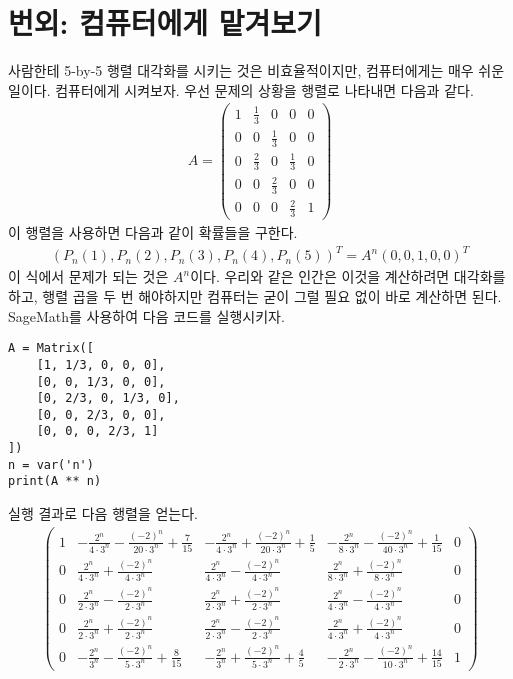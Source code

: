 \documentclass{scrartcl}
\begin{document}
\section{번외: 컴퓨터에게 맡겨보기}
사람한테 5-by-5 행렬 대각화를 시키는 것은 비효율적이지만, 컴퓨터에게는 매우 쉬운 일이다. 컴퓨터에게 시켜보자. 우선 문제의 상황을 행렬로 나타내면 다음과 같다.
\begin{align*}
  A=\begin{pmatrix}
  1 & \frac{1}{3} & 0 & 0 & 0 \\
  0 & 0 & \frac{1}{3} & 0 & 0 \\
  0 & \frac{2}{3} & 0 & \frac{1}{3} & 0 \\
  0 & 0 & \frac{2}{3} & 0 & 0 \\
  0 & 0 & 0 & \frac{2}{3} & 1
  \end{pmatrix}
\end{align*}
이 행렬을 사용하면 다음과 같이 확률들을 구한다.
\begin{align*}
  (P_n(1), P_n(2), P_n(3), P_n(4), P_n(5))^T=A^n(0, 0, 1, 0, 0)^T
\end{align*}
이 식에서 문제가 되는 것은 \(A^n\)이다. 우리와 같은 인간은 이것을 계산하려면 대각화를 하고, 행렬 곱을 두 번 해야하지만 컴퓨터는 굳이 그럴 필요 없이 바로 계산하면 된다. SageMath를 사용하여 다음 코드를 실행시키자.
\begin{lstlisting}
A = Matrix([
    [1, 1/3, 0, 0, 0],
    [0, 0, 1/3, 0, 0],
    [0, 2/3, 0, 1/3, 0],
    [0, 0, 2/3, 0, 0],
    [0, 0, 0, 2/3, 1]
])
n = var('n')
print(A ** n)
\end{lstlisting}
실행 결과로 다음 행렬을 얻는다.
\begin{align*}
  \left(\begin{array}{rrrrr}
1 & -\frac{2^{n}}{4 \cdot 3^{n}} - \frac{\left(-2\right)^{n}}{20 \cdot 3^{n}} + \frac{7}{15} & -\frac{2^{n}}{4 \cdot 3^{n}} + \frac{\left(-2\right)^{n}}{20 \cdot 3^{n}} + \frac{1}{5} & -\frac{2^{n}}{8 \cdot 3^{n}} - \frac{\left(-2\right)^{n}}{40 \cdot 3^{n}} + \frac{1}{15} & 0 \\
0 & \frac{2^{n}}{4 \cdot 3^{n}} + \frac{\left(-2\right)^{n}}{4 \cdot 3^{n}} & \frac{2^{n}}{4 \cdot 3^{n}} - \frac{\left(-2\right)^{n}}{4 \cdot 3^{n}} & \frac{2^{n}}{8 \cdot 3^{n}} + \frac{\left(-2\right)^{n}}{8 \cdot 3^{n}} & 0 \\
0 & \frac{2^{n}}{2 \cdot 3^{n}} - \frac{\left(-2\right)^{n}}{2 \cdot 3^{n}} & \frac{2^{n}}{2 \cdot 3^{n}} + \frac{\left(-2\right)^{n}}{2 \cdot 3^{n}} & \frac{2^{n}}{4 \cdot 3^{n}} - \frac{\left(-2\right)^{n}}{4 \cdot 3^{n}} & 0 \\
0 & \frac{2^{n}}{2 \cdot 3^{n}} + \frac{\left(-2\right)^{n}}{2 \cdot 3^{n}} & \frac{2^{n}}{2 \cdot 3^{n}} - \frac{\left(-2\right)^{n}}{2 \cdot 3^{n}} & \frac{2^{n}}{4 \cdot 3^{n}} + \frac{\left(-2\right)^{n}}{4 \cdot 3^{n}} & 0 \\
0 & -\frac{2^{n}}{3^{n}} - \frac{\left(-2\right)^{n}}{5 \cdot 3^{n}} + \frac{8}{15} & -\frac{2^{n}}{3^{n}} + \frac{\left(-2\right)^{n}}{5 \cdot 3^{n}} + \frac{4}{5} & -\frac{2^{n}}{2 \cdot 3^{n}} - \frac{\left(-2\right)^{n}}{10 \cdot 3^{n}} + \frac{14}{15} & 1
\end{array}\right)
\end{align*}
\end{document}
